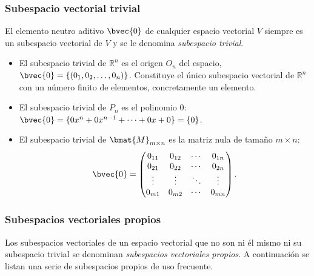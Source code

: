 \documentclass{fmbnotes}
\begin{document}
\subsubsection{Subespacio vectorial trivial}
El elemento neutro aditivo \( \bvec{0} \) de cualquier espacio vectorial \(V\) siempre es un subespacio vectorial de \(V\) y se le denomina \emph{subespacio trivial}.
\begin{itemize}
\item El subespacio trivial de \(\mathbb{R}^{n}\) es el origen \(O_n\) del espacio, \(\bvec{0}=\{(0_1,0_2,\ldots,0_n)\}\). Constituye el único subespacio vectorial de \(\mathbb{R}^{n}\) con un número finito de elementos, concretamente un elemento.
\item El subespacio trivial de \(P_n\) es el polinomio 0: \(\bvec{0}=\{0x^{n}+0x^{n-1}+\cdots+0x+0\}=\{0\}\).
\item El subespacio trivial de \(\bmat{M}_{m\times n}\) es la matriz nula de tamaño \(m \times n\):
\[\bvec{0}=\begin{pmatrix}
0_{11} & 0_{12} & \cdots & 0_{1n} \\ 0_{21} & 0_{22} & \cdots & 0_{2n} \\ \vdots & \vdots & \ddots & \vdots \\ 0_{m1} & 0_{m2} & \cdots & 0_{mn}
\end{pmatrix}.\]
\end{itemize}

\subsubsection{Subespacios vectoriales propios}

Los subespacios vectoriales de un espacio vectorial que no son ni él mismo ni su subespacio trivial se denominan \emph{subespacios vectoriales propios}. A continuación se listan una serie de subespacios propios de uso frecuente. 
\end{document}
